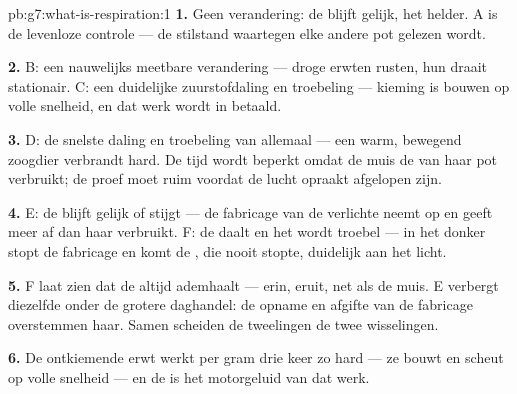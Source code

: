 \begin{solution}{pb:g7:what-is-respiration:1}
\textbf{1.} Geen verandering: de  blijft gelijk, het 
helder. A is de levenloze controle --- de stilstand waartegen elke andere
pot gelezen wordt.

\textbf{2.} B: een nauwelijks meetbare verandering --- droge erwten
rusten, hun  draait stationair. C: een duidelijke zuurstofdaling
en troebeling --- kieming is bouwen op volle snelheid, en dat werk wordt
in  betaald.

\textbf{3.} D: de snelste daling en troebeling van allemaal --- een warm,
bewegend zoogdier verbrandt hard. De tijd wordt beperkt omdat de muis de
 van haar pot verbruikt; de proef moet ruim voordat de lucht
opraakt afgelopen zijn.

\textbf{4.} E: de  blijft gelijk of stijgt --- de fabricage van de
verlichte  neemt  op en geeft meer  af dan
haar  verbruikt. F: de  daalt en het  wordt
troebel --- in het donker stopt de fabricage en komt de , die
nooit stopte, duidelijk aan het licht.

\textbf{5.} F laat zien dat de  altijd ademhaalt ---  erin,
 eruit, net als de muis. E verbergt diezelfde 
onder de grotere daghandel: de opname en afgifte van de fabricage
overstemmen haar. Samen scheiden de tweelingen de twee wisselingen.

\textbf{6.} De ontkiemende erwt werkt per gram drie keer zo hard --- ze
bouwt  en scheut op volle snelheid --- en de  is het
motorgeluid van dat werk.


\end{solution}
